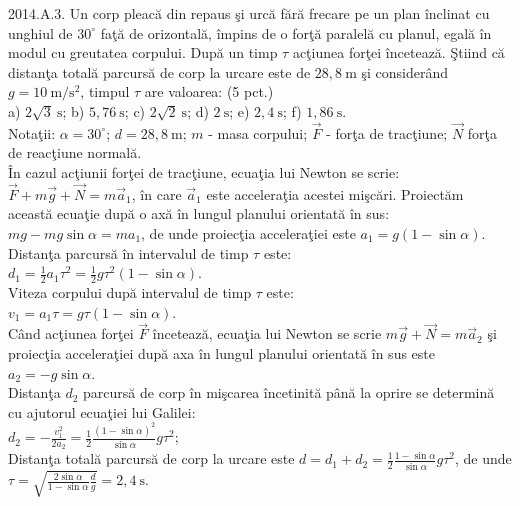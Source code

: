 2014.A.3. Un corp pleacă din repaus şi urcă fără frecare pe un plan înclinat cu unghiul de $30^{\circ}$ faţă de orizontală, împins de o forţă paralelă cu planul, egală în modul cu greutatea corpului. După un timp $\tau$ acţiunea forţei încetează. Ştiind că distanţa totală parcursă de corp la urcare este de $28,8 \mathrm{~m}$ şi considerând $g=10 \mathrm{~m} / \mathrm{s}^{2}$, timpul $\tau$ are valoarea: (5 pct.)\\ a) $2 \sqrt{3} \mathrm{~s}$; b) $5,76 \mathrm{~s}$; c) $2 \sqrt{2} \mathrm{~s}$; d) $2 \mathrm{~s}$; e) $2,4 \mathrm{~s}$; f) $1,86 \mathrm{~s}$.\\ Notaţii: $\alpha=30^{\circ}$; $d=28,8 \mathrm{~m}$; $m$ - masa corpului; $\vec{F}$ - forţa de tracţiune; $\vec{N}$ forţa de reacţiune normală.\\ În cazul acţiunii forţei de tracţiune, ecuaţia lui Newton se scrie:\\ $\vec{F}+m \vec{g}+\vec{N}=m \vec{a}_{1}$, în care $\vec{a}_{1}$ este acceleraţia acestei mişcări. Proiectăm această ecuaţie după o axă în lungul planului orientată în sus:\\ $m g-m g \sin \alpha=m a_{1}$, de unde proiecţia acceleraţiei este $a_{1}=g(1-\sin \alpha)$.\\ Distanţa parcursă în intervalul de timp $\tau$ este:\\ $d_{1}=\frac{1}{2} a_{1} \tau^{2}=\frac{1}{2} g \tau^{2}(1-\sin \alpha)$.\\ Viteza corpului după intervalul de timp $\tau$ este:\\ $v_{1}=a_{1} \tau=g \tau(1-\sin \alpha)$.\\ Când acţiunea forţei $\vec{F}$ încetează, ecuaţia lui Newton se scrie $m \vec{g}+\vec{N}=m \vec{a}_{2}$ şi proiecţia acceleraţiei după axa în lungul planului orientată în sus este $a_{2}=-g \sin \alpha$.\\ Distanţa $d_{2}$ parcursă de corp în mişcarea încetinită până la oprire se determină cu ajutorul ecuaţiei lui Galilei:\\ $d_{2}=-\frac{v_{1}^{2}}{2 a_{2}}=\frac{1}{2} \frac{(1-\sin \alpha)^{2}}{\sin \alpha} g \tau^{2}$;\\ Distanţa totală parcursă de corp la urcare este $d=d_{1}+d_{2}=\frac{1}{2} \frac{1-\sin \alpha}{\sin \alpha} g \tau^{2}$, de unde $\tau=\sqrt{\frac{2 \sin \alpha}{1-\sin \alpha} \frac{d}{g}}=2,4 \mathrm{~s}$.\\

